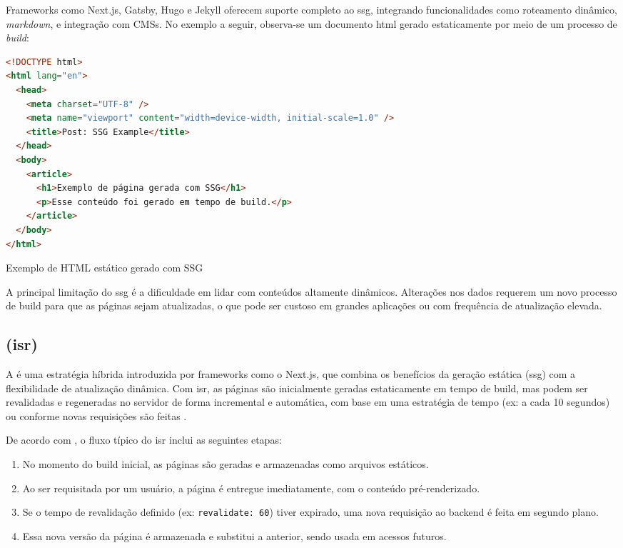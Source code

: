 Frameworks como Next.js, Gatsby, Hugo e Jekyll oferecem suporte completo ao \acrshort{ssg}, integrando funcionalidades como roteamento dinâmico, \emph{markdown}, e integração com CMSs. No exemplo a seguir, observa-se um documento \acrshort{html} gerado estaticamente por meio de um processo de \emph{build}:

\begin{codigo}[H]
  \begin{lstlisting}[language=html]
<!DOCTYPE html>
<html lang="en">
  <head>
    <meta charset="UTF-8" />
    <meta name="viewport" content="width=device-width, initial-scale=1.0" />
    <title>Post: SSG Example</title>
  </head>
  <body>
    <article>
      <h1>Exemplo de página gerada com SSG</h1>
      <p>Esse conteúdo foi gerado em tempo de build.</p>
    </article>
  </body>
</html>
  \end{lstlisting}
  \caption{Exemplo de HTML estático gerado com SSG}
  \label{cod:ssg_example}
\end{codigo}

A principal limitação do \acrshort{ssg} é a dificuldade em lidar com conteúdos altamente dinâmicos. Alterações nos dados requerem um novo processo de build para que as páginas sejam atualizadas, o que pode ser custoso em grandes aplicações ou com frequência de atualização elevada.

\subsection{ (\acrshort{isr})}
\label{subsec:isr}

A \textbf{} é uma estratégia híbrida introduzida por frameworks como o Next.js, que combina os benefícios da geração estática (\acrshort{ssg}) com a flexibilidade de atualização dinâmica. Com \acrshort{isr}, as páginas são inicialmente geradas estaticamente em tempo de build, mas podem ser revalidadas e regeneradas no servidor de forma incremental e automática, com base em uma estratégia de tempo (ex: a cada 10 segundos) ou conforme novas requisições são feitas \cite{pahan2021}.

De acordo com , o fluxo típico do \acrshort{isr} inclui as seguintes etapas:

\begin{enumerate}
    \item No momento do build inicial, as páginas são geradas e armazenadas como arquivos estáticos.
    \item Ao ser requisitada por um usuário, a página é entregue imediatamente, com o conteúdo pré-renderizado.
    \item Se o tempo de revalidação definido (ex: \texttt{revalidate: 60}) tiver expirado, uma nova requisição ao backend é feita em segundo plano.
    \item Essa nova versão da página é armazenada e substitui a anterior, sendo usada em acessos futuros.
\end{enumerate}


